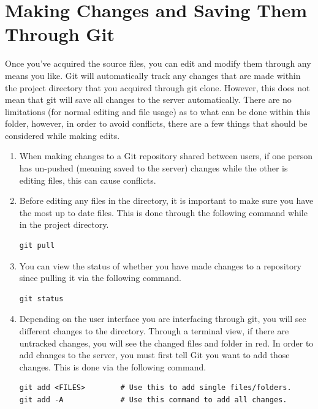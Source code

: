 \section{Making Changes and Saving Them Through Git}

Once you've acquired the source files, you can edit and modify them through any means you like. Git will automatically track any changes that are made within the project directory that you acquired through git clone. However, this does not mean that git will save all changes to the server automatically. There are no limitations (for normal editing and file usage) as to what can be done within this folder, however, in order to avoid conflicts, there are a few things that should be considered while making edits.

\begin{enumerate}
	\item When making changes to a Git repository shared between users, if one person has un-pushed (meaning saved to the server) changes while the other is editing files, this can cause conflicts. 
	\item Before editing any files in the directory, it is important to make sure you have the most up to date files. This is done through the following command while in the project directory.
	
\begin{lstlisting}
git pull
\end{lstlisting}

	\item You can view the status of whether you have made changes to a repository since pulling it via the following command.
	
\begin{lstlisting}
git status
\end{lstlisting}

	\item Depending on the user interface you are interfacing through git, you will see different changes to the directory. Through a terminal view, if there are untracked changes, you will see the changed files and folder in red. In order to add changes to the server, you must first tell Git you want to add those changes. This is done via the following command.
	
\begin{lstlisting}
git add <FILES>        # Use this to add single files/folders.
git add -A             # Use this command to add all changes.
\end{lstlisting}


\end{enumerate}
